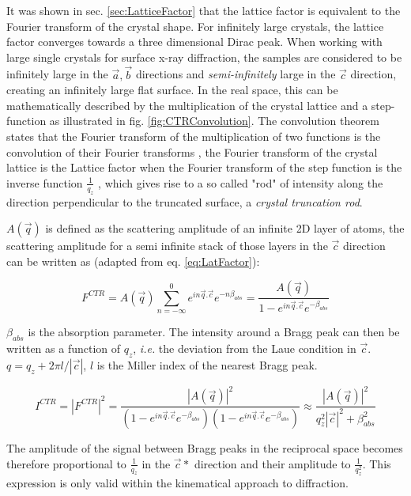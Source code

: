 It was shown in sec. \ref{sec:LatticeFactor} that the lattice factor is equivalent to the Fourier transform of the crystal shape.
For infinitely large crystals, the lattice factor converges towards a three dimensional Dirac peak.
When working with large single crystals for surface x-ray diffraction, the samples are considered to be infinitely large in the $\vec{a}, \vec{b}$ directions and \textit{semi-infinitely} large in the $\vec{c}$ direction, creating an infinitely large flat surface.
In the real space, this can be mathematically described by the multiplication of the crystal lattice and a step-function as illustrated in fig. \ref{fig:CTRConvolution}.
The convolution theorem states that the Fourier transform of the multiplication of two functions is the convolution of their Fourier transforms \parencite{Mcalister2003}, the Fourier transform of the crystal lattice is the Lattice factor when the Fourier transform of the step function is the inverse function $\frac{1}{q_z}$ \parencite{Andrews1985, Robinson1986}, which gives rise to a so called "rod" of intensity along the direction perpendicular to the truncated surface, a \textit{crystal truncation rod}.

$A(\vec{q})$ is defined as the scattering amplitude of an infinite 2D layer of atoms, the scattering amplitude for a semi infinite stack of those layers in the $\vec{c}$ direction can be written as (adapted from eq. \ref{eq:LatFactor}):

\begin{equation}
    \label{eq:CTR1}
    F^{CTR} = A(\vec{q})\sum_{n=-\infty}^0 e^{in\vec{q}.\vec{c}} e^{-n\beta_{abs}} = \frac{A(\vec{q})}{1 - e^{in\vec{q}.\vec{c}} e^{-\beta_{abs}}}
\end{equation}

$\beta_{abs}$ is the absorption parameter.
The intensity around a Bragg peak can then be written as a function of $q_z$, \textit{i.e.} the deviation from the Laue condition in $\vec{c}$.
$q = q_z + 2\pi l/|\vec{c}|$, $l$ is the Miller index of the nearest Bragg peak.

\begin{equation}
    \label{eq:CTR2}
    I^{CTR} = |F^{CTR}|^2 = \frac{|A(\vec{q})|^2}{(1 - e^{in\vec{q}.\vec{c}} e^{-\beta_{abs}})(1 - e^{in\vec{q}.\vec{c}} e^{-\beta_{abs}})} \approx \frac{|A(\vec{q})|^2}{q_z^2 |\vec{c}|^2 + \beta_{abs}^2 }
\end{equation}

The amplitude of the signal between Bragg peaks in the reciprocal space becomes therefore proportional to $\frac{1}{q_z}$ in the $\vec{c}*$ direction and their amplitude to $\frac{1}{q_z^2}$.
This expression is only valid within the kinematical approach to diffraction.

